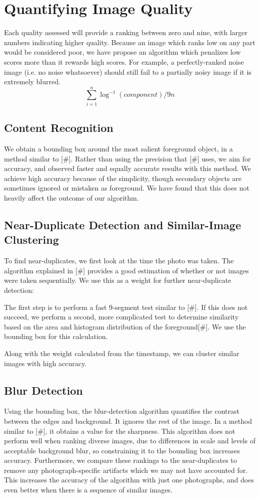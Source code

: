 \documentclass[twocolumn]{article}
\begin{document}
\section{Quantifying Image Quality}
Each quality assessed will provide a ranking between zero and nine, with larger numbers indicating higher quality. Because an image which ranks low on any part would be considered poor, we have propose an algorithm which penalizes low scores more than it rewards high scores. For example, a perfectly-ranked noise image (i.e. no noise whatsoever) should still fail to a partially noisy image if it is extremely blurred.
\[
\displaystyle\sum\limits_{i=1}^n {\log^{-1}(component)}/{9n}
\]

\subsection{Content Recognition}
We obtain a bounding box around the most salient foreground object, in a method similar to [\#]. Rather than using the precision that [\#] uses, we aim for accuracy, and observed faster and equally accurate results with this method. We achieve high accuracy because of the simplicity, though secondary objects are sometimes ignored or mistaken as foreground. We have found that this does not heavily affect the outcome of our algorithm.

\subsection{Near-Duplicate Detection and Similar-Image Clustering}
To find near-duplicates, we first look at the time the photo was taken. The algorithm explained in [\#] provides a good estimation of whether or not images were taken sequentially. We use this as a weight for further near-duplicate detection:

The first step is to perform a fast 9-segment test similar to [\#]. If this does not succeed, we perform a second, more complicated test to determine similarity based on the area and histogram distribution of the foreground[\#]. We use the bounding box for this calculation.

Along with the weight calculated from the timestamp, we can cluster similar images with high accuracy.

\subsection{Blur Detection}
Using the bounding box, the blur-detection algorithm quantifies the contrast between the edges and background. It ignores the rest of the image. In a method similar to [\#], it obtains a value for the sharpness. This algorithm does not perform well when ranking diverse images, due to differences in scale and levels of acceptable background blur, so constraining it to the bounding box increases accuracy. Furthermore, we compare these rankings to the near-duplicates to remove any photograph-specific artifacts which we may not have accounted for. This increases the accuracy of the algorithm with just one photographs, and does even better when there is a sequence of similar images.
\end{document}
